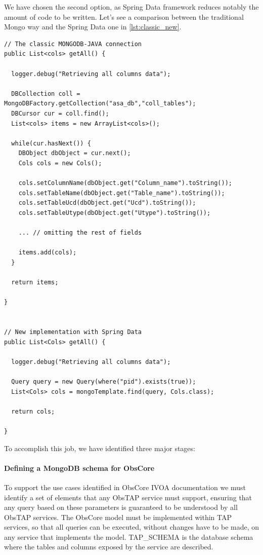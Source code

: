 We have chosen the second option, as Spring Data framework reduces notably the amount of code to be written. Let's see a comparison between the traditional Mongo way and the Spring Data one in \ref{lst:classic_new}.

\begin{lstlisting}[float,label=lst:classic_new,caption=Old vs new syntax Mongo-Java connection.]
// The classic MONGODB-JAVA connection
public List<cols> getAll() {
  
  logger.debug("Retrieving all columns data");

  DBCollection coll = MongoDBFactory.getCollection("asa_db","coll_tables");
  DBCursor cur = coll.find();
  List<cols> items = new ArrayList<cols>();

  while(cur.hasNext()) {
    DBObject dbObject = cur.next();
    Cols cols = new Cols();

    cols.setColumnName(dbObject.get("Column_name").toString());
    cols.setTableName(dbObject.get("Table_name").toString());
    cols.setTableUcd(dbObject.get("Ucd").toString());
    cols.setTableUtype(dbObject.get("Utype").toString());
    
    ... // omitting the rest of fields

    items.add(cols);
  }

  return items;

}


// New implementation with Spring Data
public List<Cols> getAll() {

  logger.debug("Retrieving all columns data");

  Query query = new Query(where("pid").exists(true));
  List<Cols> cols = mongoTemplate.find(query, Cols.class);

  return cols;

}
\end{lstlisting}



To accomplish this job, we have identified three major stages:

\paragraph*{Defining a MongoDB schema for ObsCore}
\label{sec:mongodb_obscore}
To support the use cases identified in ObsCore IVOA documentation  we must identify a set of elements that any ObsTAP service must support, ensuring that any query based on these parameters is guaranteed to be understood by all ObsTAP services.
The ObsCore model must be implemented within TAP services, so that all queries can be executed, without changes have to be made, on any service that implements the model.
TAP\_SCHEMA is the database schema where the tables and columns exposed by the service are described.



